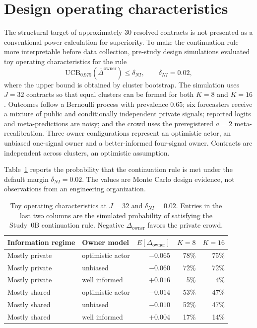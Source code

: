 \section{Design operating characteristics}

The structural target of approximately 30 resolved contracts is not presented as a conventional power calculation for superiority. To make the continuation rule more interpretable before data collection, pre-study design simulations evaluated toy operating characteristics for the rule
\[
\mathrm{UCB}_{0.975}\!\left(\overline{\Delta}^{\mathrm{owner}}\right)\le \delta_{NI},
\qquad \delta_{NI}=0.02,
\]
where the upper bound is obtained by cluster bootstrap. The simulation uses $J=32$ contracts so that equal clusters can be formed for both $K=8$ and $K=16$. Outcomes follow a Bernoulli process with prevalence 0.65; six forecasters receive a mixture of public and conditionally independent private signals; reported logits and meta-predictions are noisy; and the crowd uses the preregistered $a=2$ meta-recalibration. Three owner configurations represent an optimistic actor, an unbiased one-signal owner and a better-informed four-signal owner. Contracts are independent across clusters, an optimistic assumption.

Table~\ref{tab:continuation-oc} reports the probability that the continuation rule is met under the default margin $\delta_{NI}=0.02$. The values are Monte Carlo design evidence, not observations from an engineering organization.

\begin{table}[ht]
\centering
\small
\begin{tabular}{llrrr}
\toprule
Information regime & Owner model & $E[\Delta_{\mathrm{owner}}]$ & $K=8$ & $K=16$ \\
\midrule
Mostly private & optimistic actor & $-0.065$ & 78\% & 75\% \\
Mostly private & unbiased & $-0.060$ & 72\% & 72\% \\
Mostly private & well informed & $+0.016$ & 5\% & 4\% \\
Mostly shared & optimistic actor & $-0.014$ & 53\% & 47\% \\
Mostly shared & unbiased & $-0.010$ & 52\% & 47\% \\
Mostly shared & well informed & $+0.004$ & 17\% & 14\% \\
\bottomrule
\end{tabular}
\caption{Toy operating characteristics at $J=32$ and $\delta_{NI}=0.02$. Entries in the last two columns are the simulated probability of satisfying the Study~0B continuation rule. Negative $\Delta_{\mathrm{owner}}$ favors the private crowd.}
\label{tab:continuation-oc}
\end{table}

